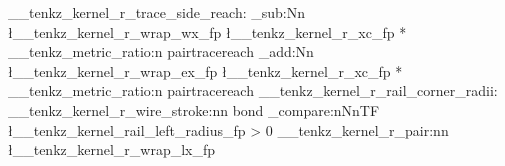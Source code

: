 {{{{              }
              {
                \__tenkz_kernel_r_trace_side_reach:
                \fp_sub:Nn \l__tenkz_kernel_r_wrap_wx_fp
                  {
                    \l__tenkz_kernel_r_xc_fp
                    * \__tenkz_metric_ratio:n {pairtracereach}
                  }
                \fp_add:Nn \l__tenkz_kernel_r_wrap_ex_fp
                  {
                    \l__tenkz_kernel_r_xc_fp
                    * \__tenkz_metric_ratio:n {pairtracereach}
                  }
                \__tenkz_kernel_r_rail_corner_radii:
                \__tenkz_kernel_r_wire_stroke:nn { bond }
                  {
                    \fp_compare:nNnTF
                      { \l__tenkz_kernel_rail_left_radius_fp } > {0}
                      {
                        \__tenkz_kernel_r_pair:nn
                          { \l__tenkz_kernel_r_wrap_lx_fp }
}}}}}}
